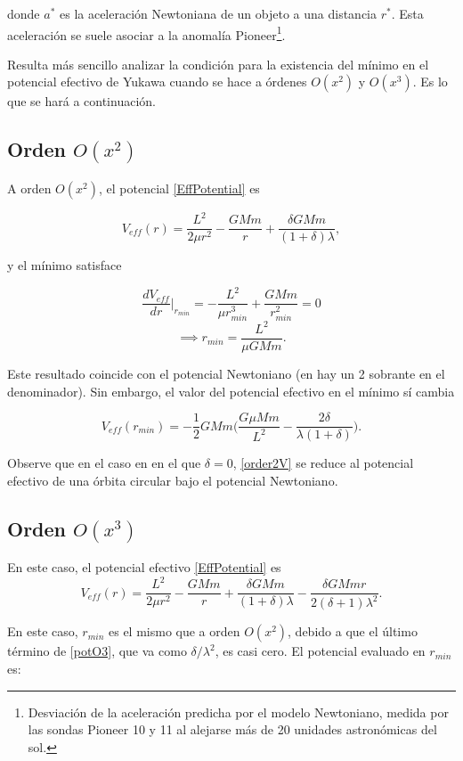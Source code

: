 \documentclass{article}
\begin{document}
donde $a^*$ es la aceleración Newtoniana de un objeto a una distancia $r^*$. Esta aceleración se suele asociar a la anomalía Pioneer\footnote{Desviación de la aceleración predicha por el modelo Newtoniano, medida por las sondas Pioneer 10 y 11 al alejarse más de 20 unidades astronómicas del sol\cite{anomaly}.}. 

Resulta más sencillo analizar la condición para la existencia del mínimo en el potencial efectivo de Yukawa cuando se hace a órdenes $O(x^2)$ y $O(x^3)$. Es lo que se hará a continuación.

\subsection{Orden $O(x^2)$}
A orden $O(x^2)$, el potencial \eqref{EffPotential} es

\begin{equation}\label{potO2}
	V_{eff}(r)=\frac{L^2}{2\mu r^2}-\frac{GMm}{r}+\frac{\delta GMm}{(1+\delta)\lambda},
\end{equation}


y el mínimo satisface

$$\frac{dV_{eff}}{dr}\Big|_{r_{min}}=-\frac{L^2}{\mu r_{min}^3}+\frac{GMm}{r_{min}^2}=0$$
$$\implies \boxed{r_{min}=\frac{L^2}{\mu GMm}.}$$

Este resultado coincide con el potencial Newtoniano (en \cite{Capozziello} hay un 2 sobrante en el denominador). Sin embargo, el valor del potencial efectivo en el mínimo sí cambia

\begin{equation}\label{order2V}
	V_{eff}(r_{min})=-\frac{1}{2}GMm\Big(\frac{G\mu Mm}{L^2}-\frac{2\delta}{\lambda(1+\delta)}\Big).
\end{equation} 

Observe que en el caso en en el que $\delta=0$, \eqref{order2V} se reduce al potencial efectivo de una órbita circular bajo el potencial Newtoniano.
\subsection{Orden $O(x^3)$}

En este caso, el potencial efectivo \eqref{EffPotential} es
\begin{equation}\label{potO3}
	V_{eff}(r)=\frac{L^2}{2\mu r^2}-\frac{GMm}{r}+\frac{\delta GMm}{(1+\delta)\lambda}-\frac{\delta GMm r}{2(\delta+1)\lambda^2}.
\end{equation}

En este caso, $r_{min}$ es el mismo que a orden $O(x^2)$, debido a que el último término de \eqref{potO3}, que va como $\delta/\lambda^2$, es casi cero. El potencial evaluado en $r_{min}$ es:
\end{document}
